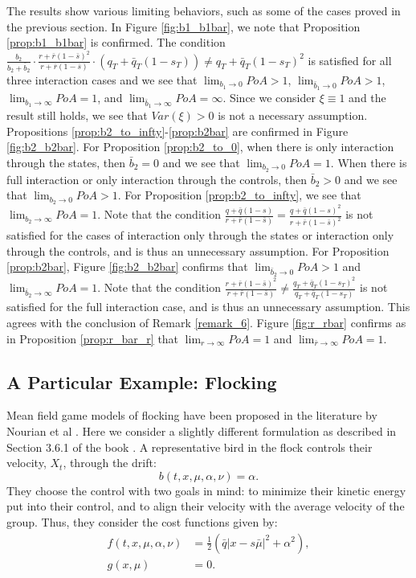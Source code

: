 \documentclass[11pt]{article}
\begin{document}
The results show various limiting behaviors, such as some of the cases proved in the previous section. In Figure \ref{fig:b1_b1bar}, we note that Proposition \ref{prop:b1_b1bar} is confirmed. The condition $\frac{b_2}{b_2+\bar{b}_2}\cdot \frac{r + \bar{r}(1- \bar{s})^2}{r + \bar{r}(1-\bar{s})}\cdot (q_T+\bar{q}_T(1-s_T)) \neq q_T+\bar{q}_T(1-s_T)^2$ is satisfied for all three interaction cases and we see that $\lim_{b_1 \to 0}PoA >1$, $\lim_{\bar{b}_1 \to 0}PoA>1$, $\lim_{b_1 \to \infty}PoA = 1$, and $\lim_{\bar{b}_1 \to \infty}PoA = \infty$. Since we consider $\xi \equiv 1$ and the result still holds, we see that $Var(\xi)>0$ is not a necessary assumption. Propositions \ref{prop:b2_to_infty}-\ref{prop:b2bar} are confirmed in Figure \ref{fig:b2_b2bar}. For Proposition \ref{prop:b2_to_0}, when there is only interaction through the states, then $\bar{b}_2=0$ and we see that $\lim_{b_2 \to 0}PoA= 1$. When there is full interaction or only interaction through the controls, then $\bar{b}_2>0$ and we see that $\lim_{b_2 \to 0}PoA>1$. For Proposition \ref{prop:b2_to_infty}, we see that $\lim_{b_2 \to \infty}PoA= 1$. Note that the condition $\frac{q + \bar{q}(1-s)}{r + \bar{r}(1-\bar{s})}= \frac{q + \bar{q}(1-s)^2}{r + \bar{r}(1-\bar{s})^2}$ is  not satisfied for the cases of interaction only through the states or interaction only through the controls, and is thus an unnecessary assumption. For Proposition \ref{prop:b2bar}, Figure \ref{fig:b2_b2bar} confirms that $\lim_{\bar{b}_2 \to 0}PoA>1$ and $\lim_{\bar{b}_2 \to \infty}PoA= 1$. Note that the condition $\frac{r + \bar{r}(1- \bar{s})^2}{r + \bar{r}(1-\bar{s})} \neq \frac{q_T+\bar{q}_T(1-s_T)^2}{q_T+\bar{q}_T(1-s_T)}$ is not satisfied for the full interaction case, and is thus an unnecessary assumption. This agrees with the conclusion of Remark \ref{remark_6}. Figure \ref{fig:r_rbar} confirms as in Proposition \ref{prop:r_bar_r} that $\lim_{r \to \infty}PoA= 1$ and $\lim_{\bar{r} \to \infty}PoA= 1$.

\subsection{\textbf{A Particular Example: Flocking}}
Mean field game models of flocking have been proposed in the literature by Nourian et al \cite{nourian2010synthesis}\cite{nourian2011mean}. Here we consider a slightly different formulation as described in Section 3.6.1 of the book \cite{Carmona_book}. A representative bird in the flock controls their velocity, $X_t$, through the drift:
\begin{equation*}
    b(t,x,\mu,\alpha,\nu)=\alpha.
\end{equation*}
They choose the control with two goals in mind: to minimize their kinetic energy put into their control, and to align their velocity with the average velocity of the group. Thus, they consider the cost functions given by:
\begin{equation*}
\begin{split}
    f(t,x,\mu,\alpha,\nu)&=\frac{1}{2}\left(\bar{q}|x-s\bar{\mu}|^2 +\alpha^2 \right), \\
    g(x,\mu)&=0.
\end{split}
\end{equation*}
\end{document}
